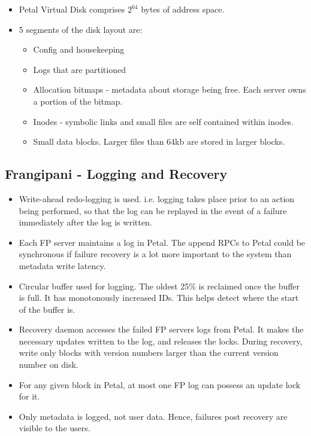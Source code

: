 \documentclass[parskip=half]{scrartcl}
\begin{document}
        \begin{itemize}
            \item 
            Petal Virtual Disk comprises $2^{64}$ bytes of address space.
            \item 
            5 segments of the disk layout are:
            \begin{itemize}
                \item 
                Config and housekeeping
                \item 
                Logs that are partitioned
                \item 
                Allocation bitmaps - metadata about storage being free. Each server owns a portion of the bitmap.
                \item 
                Inodes - symbolic links and small files are self contained within inodes.
                \item 
                Small data blocks. Larger files than 64kb are stored in larger blocks.
            \end{itemize}
        \end{itemize}


    \subsection{Frangipani - Logging and Recovery} %
    \label{sub:frangipani_logging_and_recovery}

        \begin{itemize}
            \item 
            Write-ahead redo-logging is used. i.e. logging takes place prior to an action being performed, so that the log can be replayed in the event of a failure immediately after the log is written.
            \item 
            Each FP server maintains a log in Petal. The append RPCs to Petal could be synchronous if failure recovery is a lot more important to the system than metadata write latency.
            \item 
            Circular buffer used for logging. The oldest 25\% is reclaimed once the buffer is full. It has monotonously increased IDs. This helps detect where the start of the buffer is.
            \item 
            Recovery daemon accesses the failed FP servers logs from Petal. It makes the necessary updates written to the log, and releases the locks. During recovery, write only blocks with version numbers larger than the current version number on disk.
            \item 
            For any given block in Petal, at most one FP log can possess an update lock for it.
            \item 
            Only metadata is logged, not user data. Hence, failures post recovery are visible to the users.
        \end{itemize}
    
\end{document}
